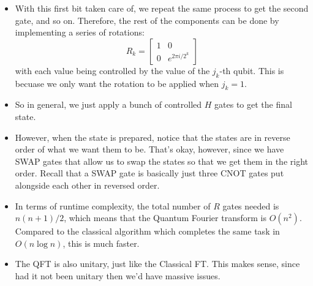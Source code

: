 \begin{itemize}
	\item With this first bit taken care of, we repeat the same process to get the second gate, and so on. Therefore,
		the rest of the components can be done by implementing a series of rotations: 
		\[
			R_k = \begin{bmatrix} 1& 0\\0 & e^{2 \pi i / 2^{k}} \end{bmatrix} 
		\] 
		with each value being controlled by the value of the \( j_k \)-th qubit. This is becuase we only want the 
		rotation to be applied when \( j_k = 1 \). 
	\item So in general, we just apply a bunch of controlled \( H \) gates to get the final state. 
	\item However, when the state is prepared, notice that the states are in reverse order of what we want them to be. 
		That's okay, however, since we have SWAP gates that allow us to swap the states so that we get them in the 
		right order. Recall that a SWAP gate is basically just three CNOT gates put alongside each other in 
		reversed order.  
	\item In terms of runtime complexity, the total number of \( R \) gates needed is \( n(n+1) / 2 \), which means 
		that the Quantum Fourier transform is \( O(n^2) \). Compared to the classical algorithm which completes
		the same task in \( O(n \log n) \), this is much faster. 
	\item The QFT is also unitary, just like the Classical FT. This makes sense, since had it not been unitary then 
		we'd have massive issues. 
\end{itemize}


